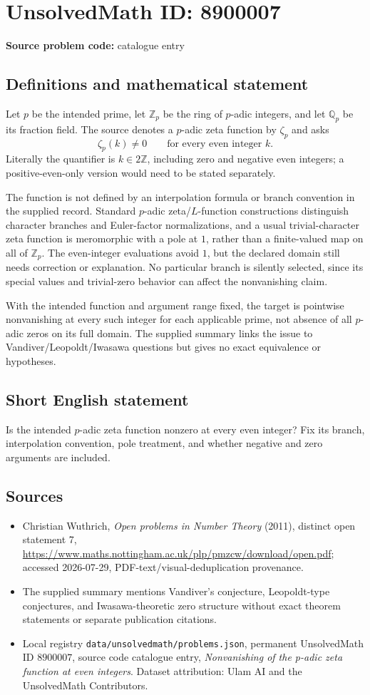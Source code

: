 \documentclass[11pt]{article}
\begin{document}
\section*{UnsolvedMath ID: 8900007}
\textbf{Source problem code:} catalogue entry
\subsection{Definitions and mathematical statement}
Let $p$ be the intended prime, let $\mathbb Z_p$ be the ring of $p$-adic integers, and let $\mathbb Q_p$ be its fraction field. The source denotes a $p$-adic zeta function by $\zeta_p$ and asks
\[
\zeta_p(k)\ne0\qquad\text{for every even integer }k.
\]
Literally the quantifier is $k\in2\mathbb Z$, including zero and negative even integers; a positive-even-only version would need to be stated separately.

The function is not defined by an interpolation formula or branch convention in the supplied record. Standard $p$-adic zeta/$L$-function constructions distinguish character branches and Euler-factor normalizations, and a usual trivial-character zeta function is meromorphic with a pole at $1$, rather than a finite-valued map on all of $\mathbb Z_p$. The even-integer evaluations avoid $1$, but the declared domain still needs correction or explanation. No particular branch is silently selected, since its special values and trivial-zero behavior can affect the nonvanishing claim.

With the intended function and argument range fixed, the target is pointwise nonvanishing at every such integer for each applicable prime, not absence of all $p$-adic zeros on its full domain. The supplied summary links the issue to Vandiver/Leopoldt/Iwasawa questions but gives no exact equivalence or hypotheses.
\subsection{Short English statement}
Is the intended $p$-adic zeta function nonzero at every even integer? Fix its branch, interpolation convention, pole treatment, and whether negative and zero arguments are included.
\subsection{Sources}
\begin{itemize}
\item Christian Wuthrich, \emph{Open problems in Number Theory} (2011), distinct open statement 7, \url{https://www.maths.nottingham.ac.uk/plp/pmzcw/download/open.pdf}; accessed 2026-07-29, PDF-text/visual-deduplication provenance.
\item The supplied summary mentions Vandiver's conjecture, Leopoldt-type conjectures, and Iwasawa-theoretic zero structure without exact theorem statements or separate publication citations.
\item Local registry \texttt{data/unsolvedmath/problems.json}, permanent UnsolvedMath ID $8900007$, source code catalogue entry, \emph{Nonvanishing of the p-adic zeta function at even integers}. Dataset attribution: Ulam AI and the UnsolvedMath Contributors.
\end{itemize}
\end{document}
